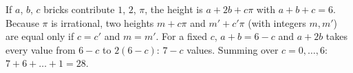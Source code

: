 If $a$, $b$, $c$ bricks contribute $1$, $2$, $\pi$, the height is $a+2b+c\pi$ with $a+b+c=6$. Because $\pi$ is irrational, two heights $m+c\pi$ and $m'+c'\pi$ (with integers $m,m'$) are equal only if $c=c'$ and $m=m'$. For a fixed $c$, $a+b=6-c$ and $a+2b$ takes every value from $6-c$ to $2(6-c)$: $7-c$ values. Summing over $c=0,\dots,6$: $7+6+\dots+1=\boxed{28}$.
